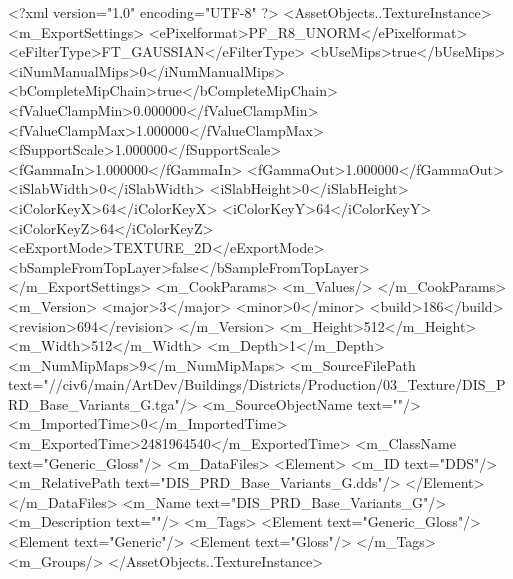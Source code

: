 <?xml version="1.0" encoding="UTF-8" ?>
<AssetObjects..TextureInstance>
	<m_ExportSettings>
		<ePixelformat>PF_R8_UNORM</ePixelformat>
		<eFilterType>FT_GAUSSIAN</eFilterType>
		<bUseMips>true</bUseMips>
		<iNumManualMips>0</iNumManualMips>
		<bCompleteMipChain>true</bCompleteMipChain>
		<fValueClampMin>0.000000</fValueClampMin>
		<fValueClampMax>1.000000</fValueClampMax>
		<fSupportScale>1.000000</fSupportScale>
		<fGammaIn>1.000000</fGammaIn>
		<fGammaOut>1.000000</fGammaOut>
		<iSlabWidth>0</iSlabWidth>
		<iSlabHeight>0</iSlabHeight>
		<iColorKeyX>64</iColorKeyX>
		<iColorKeyY>64</iColorKeyY>
		<iColorKeyZ>64</iColorKeyZ>
		<eExportMode>TEXTURE_2D</eExportMode>
		<bSampleFromTopLayer>false</bSampleFromTopLayer>
	</m_ExportSettings>
	<m_CookParams>
		<m_Values/>
	</m_CookParams>
	<m_Version>
		<major>3</major>
		<minor>0</minor>
		<build>186</build>
		<revision>694</revision>
	</m_Version>
	<m_Height>512</m_Height>
	<m_Width>512</m_Width>
	<m_Depth>1</m_Depth>
	<m_NumMipMaps>9</m_NumMipMaps>
	<m_SourceFilePath text="//civ6/main/ArtDev/Buildings/Districts/Production/03_Texture/DIS_PRD_Base_Variants_G.tga"/>
	<m_SourceObjectName text=""/>
	<m_ImportedTime>0</m_ImportedTime>
	<m_ExportedTime>2481964540</m_ExportedTime>
	<m_ClassName text="Generic_Gloss"/>
	<m_DataFiles>
		<Element>
			<m_ID text="DDS"/>
			<m_RelativePath text="DIS_PRD_Base_Variants_G.dds"/>
		</Element>
	</m_DataFiles>
	<m_Name text="DIS_PRD_Base_Variants_G"/>
	<m_Description text=""/>
	<m_Tags>
		<Element text="Generic_Gloss"/>
		<Element text="Generic"/>
		<Element text="Gloss"/>
	</m_Tags>
	<m_Groups/>
</AssetObjects..TextureInstance>

